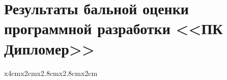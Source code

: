 \section{Результаты бальной оценки программной разработки <<ПК Дипломер>>}
\label{ap:ocenka}

\begin{longtable}{ x{4cm}x{2cm}x{2.8cm}x{2.8cm}x{2cm} } 
	
    \caption {Результаты бальной оценки ПО по функциональным возможностям}\label{tab:func_cap}\\ \toprule
\endfirsthead
\caption* {Продолжение таблицы \ref{tab:func_cap}}\\ \toprule
	
	\endhead
	
	\endfoot
	
	\endlastfoot
	

\end{longtable}
